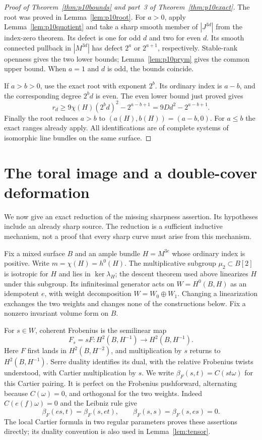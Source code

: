 \documentclass[11pt]{article}
\theoremstyle{definition}\newtheorem{definition}[theorem]{Definition}
\theoremstyle{remark}\newtheorem{remark}[theorem]{Remark}
\begin{document}
\begin{proof}[Proof of Theorem~\ref{thm:p10bounds} and part~3 of Theorem~\ref{thm:p10exact}]
The root was proved in Lemma~\ref{lem:p10root}. For $a>0$, apply Lemma~\ref{lem:p10quotient} and take a sharp smooth member of $|J^{3d}|$ from the index-zero theorem. Its defect is one for odd $d$ and two for even $d$. Its smooth connected pullback in $|M^{3d}|$ has defect $2^a$ or $2^{a+1}$, respectively. Stable-rank openness gives the two lower bounds; Lemma~\ref{lem:p10prym} gives the common upper bound. When $a=1$ and $d$ is odd, the bounds coincide.

If $a>b>0$, use the exact root with exponent $2^b$. Its ordinary index is $a-b$, and the corresponding degree $2^bd$ is even. The even lower bound just proved gives
\[
 r_d\ge9\chi(H)(2^bd)^2-2^{a-b+1}
       =9Dd^2-2^{a-b+1}.
\]
Finally the root reduces $a>b$ to $(a(H),b(H))=(a-b,0)$. For $a\le b$ the exact ranges already apply. All identifications are of complete systems of isomorphic line bundles on the same surface.
\end{proof}






\section{The toral image and a double-cover deformation}
\label{sec:toral}

We now give an exact reduction of the missing sharpness assertion. Its hypotheses include an already sharp source. The reduction is a sufficient inductive mechanism, not a proof that every sharp curve must arise from this mechanism.

Fix a mixed surface $B$ and an ample bundle $H=M^{3e}$ whose ordinary index is positive. Write $m=\chi(H)=h^0(H)$. The multiplicative subgroup $\mu _2\subset B[2]$ is isotropic for $H$ and lies in $\ker\lambda_H$; the descent theorem used above linearizes $H$ under this subgroup. Its infinitesimal generator acts on $W=H^0(B,H)$ as an idempotent $e$, with weight decomposition $W=W_0\oplus W_1$. Changing a linearization exchanges the two weights and changes none of the constructions below. Fix a nonzero invariant volume form on $B$.

For $s\in W$, coherent Frobenius is the semilinear map
\[
 F_s=sF:H^2(B,H^{-1})\longrightarrow H^2(B,H^{-1}).
\]
Here $F$ first lands in $H^2(B,H^{-2})$, and multiplication by $s$ returns to $H^2(B,H^{-1})$. Serre duality identifies its dual, with the relative Frobenius twists understood, with Cartier multiplication by $s$. We write $\beta_F(s,t)=C(st\omega)$ for this Cartier pairing. It is perfect on the Frobenius pushforward, alternating because $C(\omega)=0$, and orthogonal for the two weights. Indeed $C(e(f)\omega)=0$ and the Leibniz rule give
\[
 \beta_F(es,t)=\beta_F(s,et),\qquad
 \beta_F(s,s)=\beta_F(s,es)=0.
\]
The local Cartier formula in two regular parameters proves these assertions directly; its duality convention is also used in Lemma~\ref{lem:tensor}.
\end{document}
